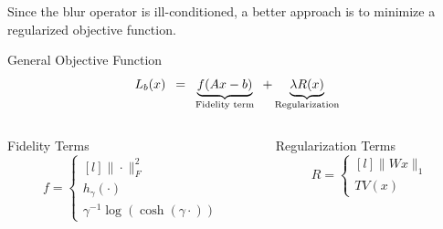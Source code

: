 \documentclass[12pt]{beamer}
\begin{document}
\begin{frame}
Since the blur operator is ill-conditioned, a better approach is to minimize a regularized objective function.
\begin{block}{General Objective Function}
\[ L_b(x) \hspace{0.5em} = \hspace{0.5em} \underbrace{f(Ax-b)}_{\text{Fidelity term}} \hspace{0.5em} + \underbrace{\lambda R(x)}_{\text{Regularization}} \]
\end{block}

\begin{columns}[T]
	\begin{column}{0.45\linewidth}
		\begin{block}{Fidelity Terms} \vspace{-2.5ex}
			\[ f = \left\{ \begin{matrix*}[l] 
			\| \cdot \|_F^2 \\[1ex] h_{\gamma}( \cdot ) \\[1ex] \gamma^{-1} \log(\cosh(\gamma \cdot)) 
			\end{matrix*} \right. \]
		\end{block}
	\end{column}
	\begin{column}{0.45\linewidth}
		\begin{block}{Regularization Terms}
			\[ R = \left\{ \begin{matrix*}[l]
			\| Wx \|_1 \\[1ex] TV(x)
			\end{matrix*} \right. \]
		\end{block}
	\end{column}
\end{columns}
\end{frame}
\end{document}
